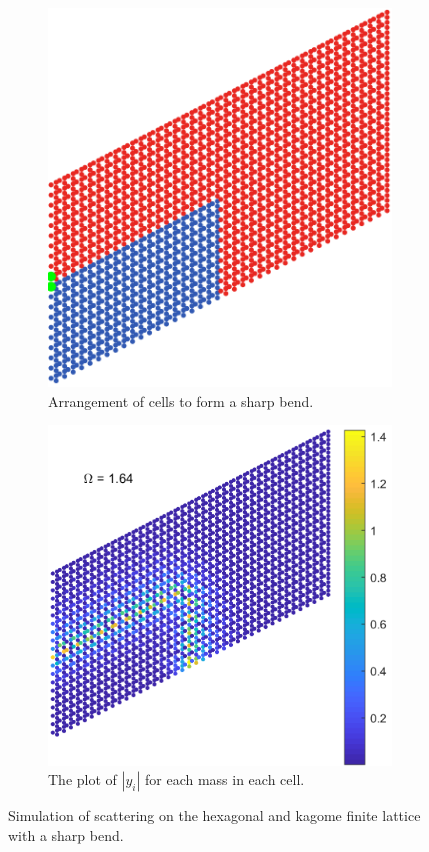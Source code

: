 \begin{figure}
\medskip
\centering
\begin{subfigure}[b]{.5\textwidth}
  \centering
  \includegraphics[width=0.8\linewidth]{imgs/kagomesharpbendarr.png}
  \caption{Arrangement of cells to form a sharp bend.}
  \label{fig:sub1}
\end{subfigure}%
\begin{subfigure}[b]{.5\textwidth}
  \centering
  \includegraphics[width=1\linewidth]{imgs/kagomesharpbendscat.png}
  \caption{The plot of $|y_i|$ for each mass in each cell.}
  \label{fig:sub2}
\end{subfigure}
\caption{Simulation of scattering on the hexagonal and kagome finite lattice
  with a sharp bend.}
\label{fig:sharpbend}
\end{figure}

